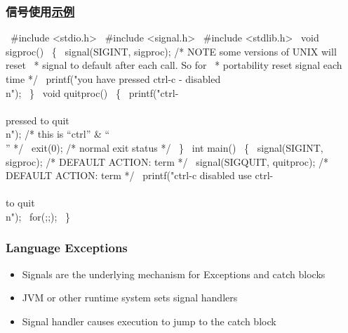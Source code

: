 % 
\begin{frame}[fragile]
    \frametitle{信号使用\href{https://stackoverflow.com/questions/4217037/catch-ctrl-c-in-c}{示例}}
\tiny
\begin{semiverbatim}
\ #include <stdio.h>
\ #include <signal.h>
\ #include <stdlib.h>
\ void sigproc()
\ \{       
\     signal(SIGINT, sigproc);   /* NOTE some versions of UNIX will reset 
\                 * signal to default after each call. So for 
\                 * portability reset signal each time */
\     printf("you have pressed ctrl-c - disabled \\n");
\ \}
\ void quitproc()
\ \{        
\     printf("ctrl-\\\\ pressed to quit\\n");   /* this is “ctrl” \& “\\” */
\     exit(0); /* normal exit status */
\ \}
\ int main()
\ \{ 
\     signal(SIGINT, sigproc);    /* DEFAULT ACTION: term */
\     signal(SIGQUIT, quitproc);  /* DEFAULT ACTION: term */
\     printf("ctrl-c disabled use ctrl-\\\\ to quit\\n");
\     for(;;);
\ \}
\end{semiverbatim}

\end{frame}
\begin{frame}[fragile]
    \frametitle{Language Exceptions}
    \begin{itemize}
        \item Signals are the underlying mechanism for Exceptions and catch blocks \pause
        \item JVM or other runtime system sets signal handlers \pause
        \item Signal handler causes execution to jump to the catch block
    \end{itemize}
\end{frame}
% 

